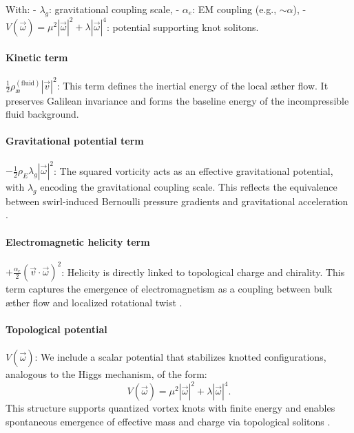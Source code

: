 \documentclass[preprint]{revtex4-2}
\begin{document}
With:
- \( \lambda_g \): gravitational coupling scale,
- \( \alpha_e \): EM coupling (e.g., \( \sim \alpha \)),
- \( V(\vec{\omega}) = \mu^2 |\vec{\omega}|^2 + \lambda |\vec{\omega}|^4 \): potential supporting knot solitons.

\paragraph{Kinetic term}
$\frac{1}{2} \rho_\text{\ae}^{(\text{fluid})} |\vec{v}|^2$:
This term defines the inertial energy of the local \ae{}ther flow. It preserves Galilean invariance and forms the baseline energy of the incompressible fluid background.

\paragraph{Gravitational potential term}
$-\frac{1}{2} \rho_{\scriptscriptstyle\boldsymbol\!E}\lambda_g |\vec{\omega}|^2$:
The squared vorticity acts as an effective gravitational potential, with $\lambda_g$ encoding the gravitational coupling scale. This reflects the equivalence between swirl-induced Bernoulli pressure gradients and gravitational acceleration \cite{helmholtz1858integrals, batchelor2000introduction}.

\paragraph{Electromagnetic helicity term}
$+\frac{\alpha_e}{2} (\vec{v} \cdot \vec{\omega})^2$:
Helicity is directly linked to topological charge and chirality. This term captures the emergence of electromagnetism as a coupling between bulk æther flow and localized rotational twist \cite{moffatt1969degree, kato1990topological}.

\paragraph{Topological potential}
$V(\vec{\omega})$:
We include a scalar potential that stabilizes knotted configurations, analogous to the Higgs mechanism, of the form:
\begin{equation}
V(\vec{\omega}) = \mu^2 |\vec{\omega}|^2 + \lambda |\vec{\omega}|^4.
\end{equation}
This structure supports quantized vortex knots with finite energy and enables spontaneous emergence of effective mass and charge via topological solitons \cite{ranada1990topological, arrayas2017knots}.
\end{document}
